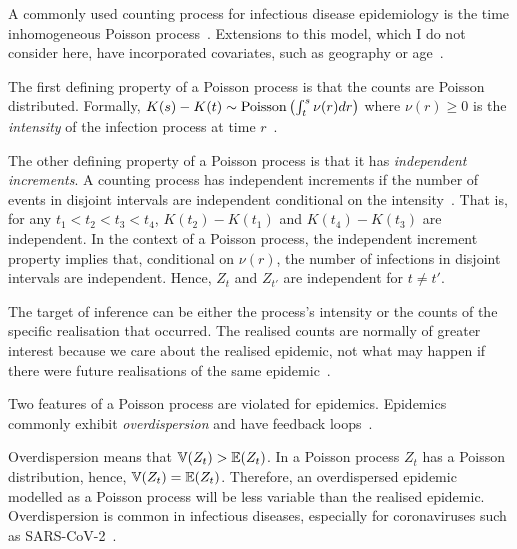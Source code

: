 \documentclass[thesis.tex]{subfiles}
\begin{document}
A commonly used counting process for infectious disease epidemiology is the time inhomogeneous Poisson process~\autocite[e.g., in the context of HIV,][]{brookmeyerMethod,paganoHIV,rosenbergBackcalculation,brookmeyerBackcalculation}.
Extensions to this model, which I do not consider here, have incorporated covariates, such as geography or age~\autocite[e.g.][]{diggleModeling}.

The first defining property of a Poisson process is that the counts are Poisson distributed.
Formally, $K(s) - K(t) \sim \operatorname{Poisson}\left(\int^s_t \nu(r) dr \right)$ where $\nu(r) \geq 0$ is the \emph{intensity} of the infection process at time $r$~\autocite[244]{yanDistribution}.

The other defining property of a Poisson process is that it has \emph{independent increments}.
A counting process has independent increments if the number of events in disjoint intervals are independent conditional on the intensity~\autocite[244]{yanDistribution}.
That is, for any $t_1 < t_2 < t_3 < t_4$, $K(t_2) - K(t_1)$ and $K(t_4) - K(t_3)$ are independent.
In the context of a Poisson process, the independent increment property implies that, conditional on $\nu(r)$, the number of infections in disjoint intervals are independent.
Hence, $Z_t$ and $Z_{t'}$ are independent for $t \neq t'$.

The target of inference can be either the process's intensity or the counts of the specific realisation that occurred.
The realised counts are normally of greater interest because we care about the realised epidemic, not what may happen if there were future realisations of the same epidemic~\autocite{beckerDependent,brookmeyerMethod}.

Two features of a Poisson process are violated for epidemics.
Epidemics commonly exhibit \emph{overdispersion} and have feedback loops~\autocite{beckerDependent}.

Overdispersion means that $\operatorname{\mathbb{V}}(Z_t) > \operatorname{\mathbb{E}}(Z_t)$.
In a Poisson process $Z_t$ has a Poisson distribution, hence, $\operatorname{\mathbb{V}}(Z_t) = \operatorname{\mathbb{E}}(Z_t)$.
Therefore, an overdispersed epidemic modelled as a Poisson process will be less variable than the realised epidemic.
Overdispersion is common in infectious diseases, especially for coronaviruses such as SARS-CoV-2~\autocite{endoEstimating,adamClustering,mccloskeySARS}.
\end{document}
